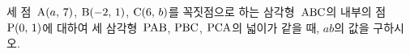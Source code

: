 세 점~$\mathrm{A}(a,\mkern3mu 7)$, $\mathrm{B}(-2,\mkern3mu 1)$, $\mathrm{C}(6,\mkern3mu b)$를 꼭짓점으로 하는 삼각형~$\mathrm{ABC}$의 내부의 점~$\mathrm{P}(0,\mkern3mu 1)$에 대하여 세 삼각형~$\mathrm{PAB}$, $\mathrm{PBC}$, $\mathrm{PCA}$의 넓이가 같을 때, $ab$의 값을 구하시오.
